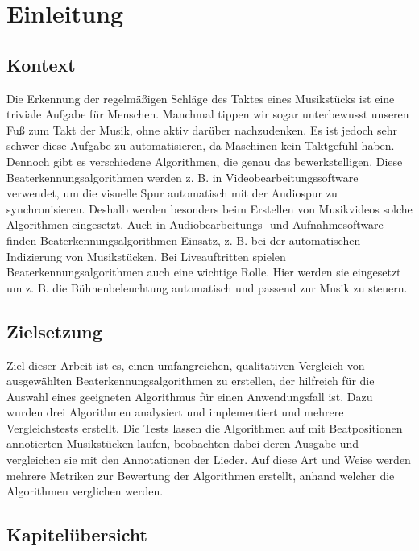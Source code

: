 \chapter{Einleitung}
\label{einleitung}
\acresetall

\section{Kontext}
{
	Die Erkennung der regelmä{\ss}igen Schläge des Taktes eines Musikstücks ist eine triviale Aufgabe für Menschen.
	Manchmal tippen wir sogar unterbewusst unseren Fu{\ss} zum Takt der Musik,
		ohne aktiv darüber nachzudenken.
	Es ist jedoch sehr schwer diese Aufgabe zu automatisieren,
		da Maschinen kein Taktgefühl haben.
	Dennoch gibt es verschiedene Algorithmen,
		die genau das bewerkstelligen.
	Diese Beaterkennungsalgorithmen werden z. B. in Videobearbeitungssoftware verwendet,
		um die visuelle Spur automatisch mit der Audiospur zu synchronisieren.
	Deshalb werden besonders beim Erstellen von Musikvideos solche Algorithmen eingesetzt.
	Auch in Audiobearbeitungs- und Aufnahmesoftware finden Beaterkennungsalgorithmen Einsatz,
		z. B. bei der automatischen Indizierung von Musikstücken.
	Bei Liveauftritten spielen Beaterkennungsalgorithmen auch eine wichtige Rolle.
	Hier werden sie eingesetzt um z. B. die Bühnenbeleuchtung automatisch und passend zur Musik zu steuern.
}

\section{Zielsetzung}
{
	Ziel dieser Arbeit ist es,
		einen umfangreichen, qualitativen Vergleich von ausgewählten Beaterkennungsalgorithmen zu erstellen,
		der hilfreich für die Auswahl eines geeigneten Algorithmus für einen Anwendungsfall ist.
	Dazu wurden drei Algorithmen analysiert und implementiert
		und mehrere Vergleichstests erstellt.
	Die Tests lassen die Algorithmen auf mit Beatpositionen annotierten Musikstücken laufen,
		beobachten dabei deren Ausgabe
		und vergleichen sie mit den Annotationen der Lieder.
	Auf diese Art und Weise werden mehrere Metriken zur Bewertung der Algorithmen erstellt,
		anhand welcher die Algorithmen verglichen werden.
}

\section{Kapitelübersicht}
{
}

